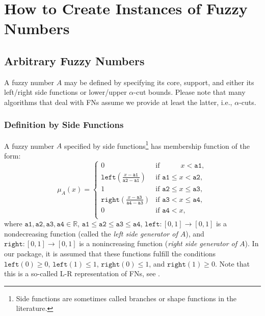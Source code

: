 \documentclass[11pt]{article}\usepackage[]{graphicx}\usepackage[]{color}
\begin{document}





\section{How to Create Instances of Fuzzy Numbers}


\subsection{Arbitrary Fuzzy Numbers}

A fuzzy number $A$ may be defined by specifying
its core, support, and either its left/right side functions
or lower/upper $\alpha$-cut bounds. Please note that many algorithms that
deal with FNs assume we provide at least the latter, i.e., $\alpha$-cuts.

\subsubsection{Definition by Side Functions}

A fuzzy number $A$ specified by side functions\footnote{Side functions
  are sometimes called branches or shape functions in the literature.}
has membership function of the form:
\begin{equation}
\mu_A(x) = \left\{\begin{array}{ll}
0 & \text{if } \phantom{\mathtt{a2}\le\ } x<\mathtt{a1}, \\
\mathtt{left}\left( \frac{x-\mathtt{a1}}{\mathtt{a2-a1}} \right)  & \text{if } \mathtt{a1} \le x < \mathtt{a2}, \\
1 & \text{if } \mathtt{a2}\le x\le\mathtt{a3}, \\
\mathtt{right}\left( \frac{x-\mathtt{a3}}{\mathtt{a4-a3}} \right)  & \text{if } \mathtt{a3} < x \le \mathtt{a4}, \\
0 & \text{if } \mathtt{a4}<x, \\
\end{array}\right.
\end{equation}
where $\mathtt{a1},\mathtt{a2},\mathtt{a3},\mathtt{a4}\in\mathbb{R}$,
$\mathtt{a1}\le\mathtt{a2}\le\mathtt{a3}\le\mathtt{a4}$,
$\mathtt{left}: [0,1]\to[0,1]$ is a nondecreasing function
(called the \textit{left side generator of $A$}),
and $\mathtt{right}: [0,1]\to[0,1]$ is a nonincreasing function
(\textit{right side generator of $A$}).
In our package, it is assumed that these functions fulfill the conditions
$\mathtt{left}(0)\ge 0$, $\mathtt{left}(1)\le 1$,
$\mathtt{right}(0)\le 1$, and $\mathtt{right}(1)\ge 0$.
Note that this is a so-called L-R representation of FNs,
see \cite{DuboisPrade1987:fnoverview}.
\end{document}
